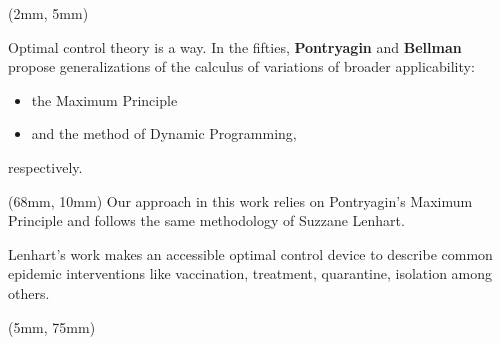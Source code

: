 {%
\begin{frame}{}
        \begin{textblock*}{55mm}(2mm, 5mm)
        \begin{beamerboxesrounded}{Optimal control theory is a way.}
                In the fifties, \textbf{Pontryagin} and
            \textbf{Bellman} propose generalizations of the calculus
            of variations of broader applicability:
            \begin{itemize}
                \item
                    the Maximum Principle
                \item
                    and the method of Dynamic Programming,
            \end{itemize}
            respectively.
        \end{beamerboxesrounded}
    \end{textblock*}

    \begin{textblock*}{60mm}(68mm, 10mm)
        Our approach in this work relies on Pontryagin's Maximum
        Principle and follows the same methodology of Suzzane Lenhart.

            Lenhart's work makes an accessible optimal
        control device to describe common epidemic interventions like
        vaccination, treatment, quarantine, isolation among others.
    \end{textblock*}
    \begin{textblock*}{120mm}(5mm, 75mm)
        \begin{bibunit}[apalike]
            \nocite{lenhart2007optimal}
            \putbib
        \end{bibunit}
    \end{textblock*}
\end{frame}
}
